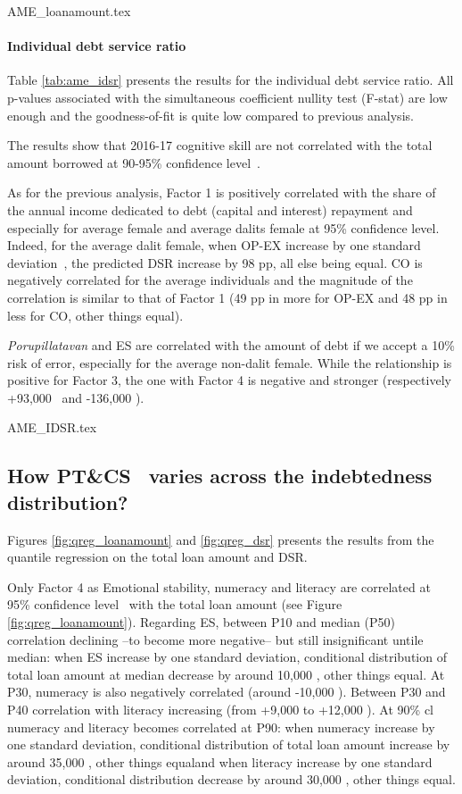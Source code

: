 \documentclass[a4paper, 11pt, onecolumn]{article}
\newcommand{\sd}{standard deviation}
\newcommand{\aebe}{all else being equal}
\newcommand{\ote}{other things equal}
\newcommand{\cl}{confidence level}
\newcommand{\PTCS}{PT\&CS}
\begin{document}
{AME_loanamount.tex}

\paragraph{Individual debt service ratio}
Table \ref{tab:ame_idsr} presents the results for the individual debt service ratio.
All p-values associated with the simultaneous coefficient nullity test (F-stat) are low enough and the goodness-of-fit is quite low compared to previous analysis.

The results show that 2016-17 cognitive skill are not correlated with the total amount borrowed at 90-95\% \cl~.

As for the previous analysis, Factor 1 is positively correlated with the share of the annual income dedicated to debt (capital and interest) repayment and especially for average female and average dalits female at 95\% \cl.
Indeed, for the average dalit female, when OP-EX increase by one \sd~, the predicted DSR increase by 98 pp, \aebe.
CO is negatively correlated for the average individuals and the magnitude of the correlation is similar to that of Factor 1 (49 pp in more for OP-EX and 48 pp in less for CO, \ote).

\textit{Porupillatavan} and ES are correlated with the amount of debt if we accept a 10\% risk of error, especially for the average non-dalit female.
While the relationship is positive for Factor 3, the one with Factor 4 is negative and stronger (respectively +93,000 \rupee~and -136,000 \rupee).

{AME_IDSR.tex}



\subsection{How \PTCS~ varies across the indebtedness distribution?}

Figures \ref{fig:qreg_loanamount} and \ref{fig:qreg_dsr} presents the results from the quantile regression on the total loan amount and DSR.

Only Factor 4 as Emotional stability, numeracy and literacy are correlated at 95\% \cl~ with the total loan amount (see Figure \ref{fig:qreg_loanamount}).
Regarding ES, between P10 and median (P50) correlation declining --to become more negative-- but still insignificant untile median: when ES increase by one \sd, conditional distribution of total loan amount at median decrease by around 10,000 \rupee, \ote.
At P30, numeracy is also negatively correlated (around -10,000 \rupee).
Between P30 and P40 correlation with literacy increasing (from +9,000 to +12,000 \rupee).
At 90\% cl numeracy and literacy becomes correlated at P90: when numeracy increase by one \sd, conditional distribution of total loan amount increase by around 35,000 \rupee, \ote and when literacy increase by one \sd, conditional distribution decrease by around 30,000 \rupee, \ote.
\end{document}
